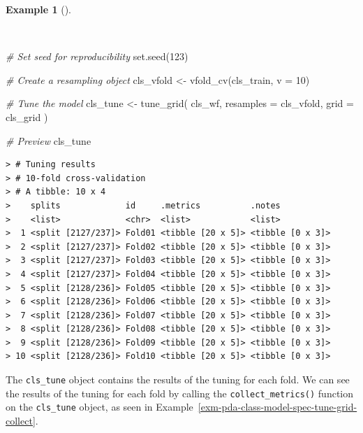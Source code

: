 \documentclass[
  letterpaper,
]{latex/krantz}
\newenvironment{Shaded}{\begin{snugshade}}{\end{snugshade}}
\newcommand{\AttributeTok}[1]{\textcolor[rgb]{0.00,0.00,0.00}{#1}}
\newcommand{\CommentTok}[1]{\textcolor[rgb]{0.00,0.00,0.00}{\textit{#1}}}
\newcommand{\DecValTok}[1]{\textcolor[rgb]{0.00,0.00,0.00}{#1}}
\newcommand{\FunctionTok}[1]{\textcolor[rgb]{0.00,0.00,0.00}{#1}}
\newcommand{\NormalTok}[1]{\textcolor[rgb]{0.00,0.00,0.00}{#1}}
\newcommand{\OtherTok}[1]{\textcolor[rgb]{0.00,0.00,0.00}{#1}}
\theoremstyle{definition}
\newtheorem{example}{Example}[chapter]
\theoremstyle{remark}
\begin{document}
\begin{example}[]\protect\hypertarget{exm-pda-class-model-spec-tune-grid-cv}{}\label{exm-pda-class-model-spec-tune-grid-cv}

~

\begin{Shaded}
\begin{Highlighting}[]
\CommentTok{\# Set seed for reproducibility}
\FunctionTok{set.seed}\NormalTok{(}\DecValTok{123}\NormalTok{)}

\CommentTok{\# Create a resampling object}
\NormalTok{cls\_vfold }\OtherTok{\textless{}{-}} \FunctionTok{vfold\_cv}\NormalTok{(cls\_train, }\AttributeTok{v =} \DecValTok{10}\NormalTok{)}

\CommentTok{\# Tune the model}
\NormalTok{cls\_tune }\OtherTok{\textless{}{-}}
  \FunctionTok{tune\_grid}\NormalTok{(}
\NormalTok{    cls\_wf,}
    \AttributeTok{resamples =}\NormalTok{ cls\_vfold,}
    \AttributeTok{grid =}\NormalTok{ cls\_grid}
\NormalTok{    )}

\CommentTok{\# Preview}
\NormalTok{cls\_tune}
\end{Highlighting}
\end{Shaded}

\begin{verbatim}
> # Tuning results
> # 10-fold cross-validation 
> # A tibble: 10 x 4
>    splits             id     .metrics          .notes          
>    <list>             <chr>  <list>            <list>          
>  1 <split [2127/237]> Fold01 <tibble [20 x 5]> <tibble [0 x 3]>
>  2 <split [2127/237]> Fold02 <tibble [20 x 5]> <tibble [0 x 3]>
>  3 <split [2127/237]> Fold03 <tibble [20 x 5]> <tibble [0 x 3]>
>  4 <split [2127/237]> Fold04 <tibble [20 x 5]> <tibble [0 x 3]>
>  5 <split [2128/236]> Fold05 <tibble [20 x 5]> <tibble [0 x 3]>
>  6 <split [2128/236]> Fold06 <tibble [20 x 5]> <tibble [0 x 3]>
>  7 <split [2128/236]> Fold07 <tibble [20 x 5]> <tibble [0 x 3]>
>  8 <split [2128/236]> Fold08 <tibble [20 x 5]> <tibble [0 x 3]>
>  9 <split [2128/236]> Fold09 <tibble [20 x 5]> <tibble [0 x 3]>
> 10 <split [2128/236]> Fold10 <tibble [20 x 5]> <tibble [0 x 3]>
\end{verbatim}

\end{example}

The \texttt{cls\_tune} object contains the results of the tuning for
each fold. We can see the results of the tuning for each fold by calling
the \texttt{collect\_metrics()} function on the \texttt{cls\_tune}
object, as seen in
Example~\ref{exm-pda-class-model-spec-tune-grid-collect}.
\end{document}
